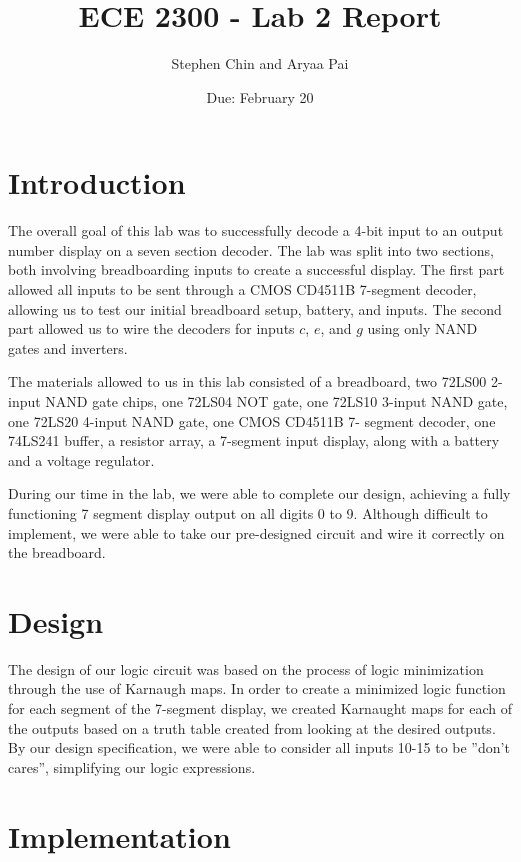 \documentclass{article}
\title{ECE 2300 - Lab 2 Report}
\author{Stephen Chin and Aryaa Pai}
\date{Due: February 20}
\begin{document}
\maketitle



\section{Introduction}

The overall goal of this lab was to successfully decode a 4-bit
input to an output number display on a seven section decoder. The lab
was split into two sections, both involving breadboarding inputs to
create a successful display. The first part allowed all inputs to be
sent through a CMOS CD4511B 7-segment decoder, allowing us to test our
initial breadboard setup, battery, and inputs. The second part allowed
us to wire the decoders for inputs $c$, $e$, and $g$ using only NAND
gates and inverters.

The materials allowed to us in this lab consisted of a breadboard, two
72LS00 2-input NAND gate chips, one 72LS04 NOT gate, one 72LS10
3-input NAND gate, one 72LS20 4-input NAND gate, one CMOS CD4511B 7-
segment decoder, one 74LS241 buffer, a resistor array, a 7-segment
input display, along with a battery and a voltage regulator.

During our time in the lab, we were able to complete our design,
achieving a fully functioning 7 segment display output on all digits 0
to 9. Although difficult to implement, we were able to take our
pre-designed circuit and wire it correctly on the breadboard.


\section{Design}


The design of our logic circuit was based on the process of logic
minimization through the use of Karnaugh maps. In order to create a
minimized logic function for each segment of the 7-segment display, we
created Karnaught maps for each of the outputs based on a truth table
created from looking at the desired outputs. By our design
specification, we were able to consider all inputs 10-15 to be ''don't
cares'', simplifying our logic expressions.



\section{Implementation}
\end{document}
